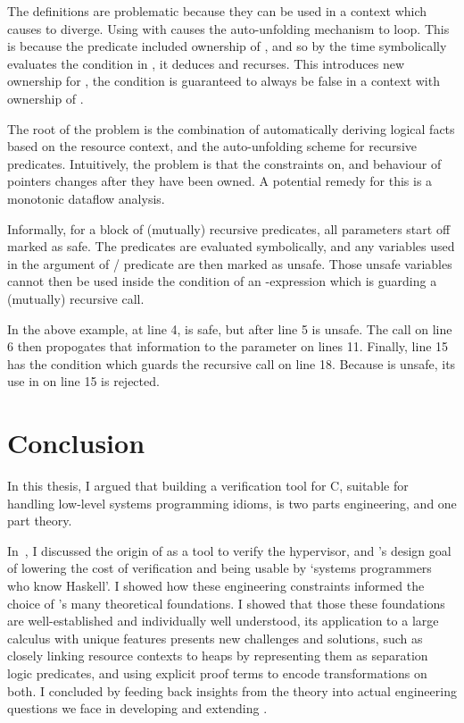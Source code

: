 
The definitions are problematic because they can be used in a context which
causes  to diverge. Using  %
with  causes the auto-unfolding mechanism to loop. %
This is because the  predicate included ownership of
, and so by the time  symbolically evaluates the
condition in , it deduces
 and recurses. This introduces new %
ownership for , the condition is guaranteed to always be
false in a context with ownership of .

The root of the problem is the combination of automatically deriving logical
facts based on the resource context, and the auto-unfolding scheme for
recursive predicates. Intuitively, the problem is that the constraints on, and
behaviour of pointers changes after they have been owned. A potential remedy
for this is a monotonic dataflow analysis.

Informally, for a block of (mutually) recursive predicates, all parameters
start off marked as safe. The predicates are evaluated symbolically, and any
variables used in the argument of / predicate are then
marked as unsafe. Those unsafe variables cannot then be used inside the
condition of an -expression which is guarding a (mutually)
recursive call.

In the above example, at line 4,  is safe, but after line 5
 is unsafe. The call on line 6 then propogates that information
to the parameter on lines 11. Finally, line 15 has the condition which guards
the recursive call on line 18. Because  is unsafe, its use in
on line 15 is rejected.

\chapter{Conclusion}%
\label{chap:conclusion}

\margintoc{}

In this thesis, I argued that building a verification tool for C, suitable
for handling low-level systems programming idioms, is two parts engineering,
and one part theory.

In~, I discussed the origin of  as a tool
to verify the  hypervisor, and 's design goal of lowering the
cost of verification and being usable by `systems programmers who know
Haskell'. I showed how these engineering constraints informed the choice of
's many theoretical foundations. I showed that those these foundations
are well-established and individually well understood, its application to a
large calculus  with unique features presents new challenges and
solutions, such as closely linking resource contexts to heaps by representing
them as separation logic predicates, and using explicit proof terms to encode
transformations on both. I concluded by feeding back insights from the theory
into actual engineering questions we face in developing and extending .

